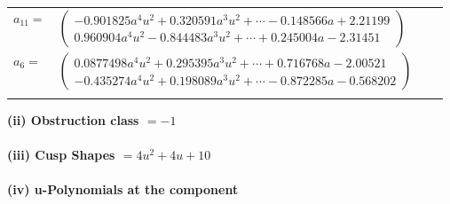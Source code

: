 \documentclass[1p]{elsarticle_modified}
\theoremstyle{definition}
\begin{document}
\begin{tabular}{m{7pt} m{180pt} m{7pt} m{180pt} }
\flushright $a_{11}=$&$\begin{pmatrix}-0.901825 a^{4} u^{2}+0.320591 a^{3} u^{2}+\cdots-0.148566 a+2.21199\\0.960904 a^{4} u^{2}-0.844483 a^{3} u^{2}+\cdots+0.245004 a-2.31451\end{pmatrix}$ \\
\flushright $a_{6}=$&$\begin{pmatrix}0.0877498 a^{4} u^{2}+0.295395 a^{3} u^{2}+\cdots+0.716768 a-2.00521\\-0.435274 a^{4} u^{2}+0.198089 a^{3} u^{2}+\cdots-0.872285 a-0.568202\end{pmatrix}$\\&\end{tabular}
\flushleft \textbf{(ii) Obstruction class $= -1$}\\~\\
\flushleft \textbf{(iii) Cusp Shapes $= 4 u^2+4 u+10$}\\~\\
\newpage\renewcommand{\arraystretch}{1}
\flushleft \textbf{(iv) u-Polynomials at the component}\newline \\
\end{document}
